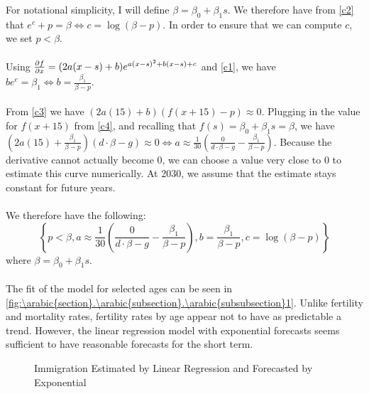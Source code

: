 \documentclass[10pt]{article}
\renewcommand{\thesection}{\arabic{section}}
\renewcommand{\thesubsection}{\thesection.\arabic{subsection}}
\renewcommand{\thesubsubsection}{\thesubsection.\arabic{subsubsection}}
\numberwithin{equation}{subsection}
\newcommand*{\FigureDir}{../../graphs}
\begin{document}
\begin{appendices}
\noindent
For notational simplicity, I will define \(\beta = \beta_0 + \beta_1s\). We therefore have from \ref{c2} that \(e^c + p = \beta \Leftrightarrow c = \log(\beta - p)\). In order to ensure that we can compute \(c\), we set \(p < \beta\).
\\\\
Using \(\pdv{f}{x} = (2a(x-s) + b)e^{a(x-s)^2 + b(x-s) + c}\) and \ref{c1}, we have \(be^c = \beta_1 \Leftrightarrow b = \frac{\beta_1}{\beta - p}\).
\\\\
From \ref{c3} we have \((2a(15) + b)(f(x+15) - p) \approx 0\). Plugging in the value for \(f(x+15)\) from \ref{c4}, and recalling that \(f(s) = \beta_0 + \beta_1s = \beta\), we have \(\left(2a(15) + \frac{\beta_1}{\beta - p}\right)(d\cdot \beta - g) \approx 0 \Leftrightarrow a \approx \frac{1}{30}\left(\frac{0}{d\cdot\beta-g} - \frac{\beta_1}{\beta - p}\right)\). Because the derivative cannot actually become 0, we can choose a value very close to 0 to estimate this curve numerically. At 2030, we assume that the estimate stays constant for future years.
\\\\
We therefore have the following:
\[
   \left\{
      p < \beta,
      a \approx \frac{1}{30}\left(\frac{0}{d\cdot\beta - g} - \frac{\beta_1}{\beta - p}\right),
      b = \frac{\beta_1}{\beta - p},
      c = \log(\beta - p)
   \right\}
\]
\noindent
where \(\beta = \beta_0 + \beta_1s\).
\\\\
The fit of the model for selected ages can be seen in \autoref{fig:\thesubsubsection1}. Unlike fertility and mortality rates, fertility rates by age appear not to have as predictable a trend. However, the linear regression model with exponential forecasts seems sufficient to have reasonable forecasts for the short term.

\begin{figure}[H]
   \centering
   \caption{\label{fig:\thesubsubsection1}Immigration Estimated by Linear Regression and Forecasted by Exponential}
\end{figure}


\end{appendices}
\end{document}
